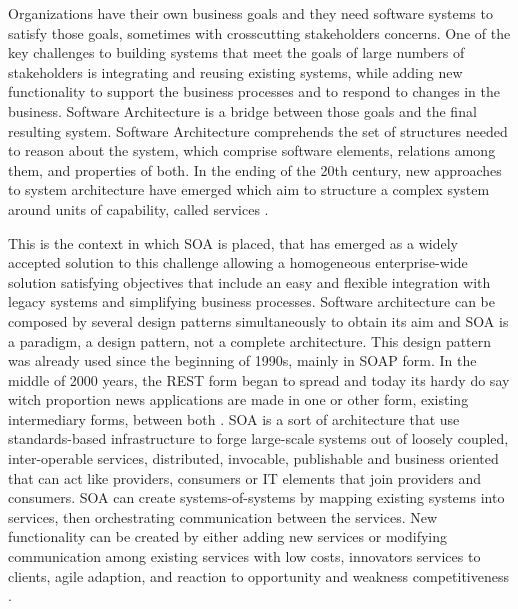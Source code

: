 Organizations have their own business goals and they need software systems to satisfy those goals, sometimes with crosscutting stakeholders concerns. One of the key challenges to building systems that meet the goals of large numbers of stakeholders is integrating and reusing existing systems, while adding new functionality to support the business processes and to respond to changes in the business. Software Architecture is a bridge between those goals and the final resulting system. Software Architecture comprehends the set of structures needed to reason about the system, which comprise software elements, relations among them, and properties of both. In the ending of the 20th century, new approaches to system architecture have emerged which aim to structure a complex system around units of capability, called services \cite{bass2007software,Demchak2007,krogdahl2005service}.

This is the context in which \acrfull{SOA} is placed, that has emerged as a widely accepted solution to this challenge allowing a homogeneous enterprise-wide solution satisfying objectives that include an easy and flexible integration with legacy systems and simplifying business processes. Software architecture can be composed by several design patterns simultaneously to obtain its aim and \acrshort{SOA} is a paradigm, a design pattern, not a complete architecture. This design pattern was already used since the beginning of 1990s, mainly in \acrfull{SOAP} \cite{erl2008soa,ZurMuehlen2005} form. In the middle of 2000 years, the \acrfull{REST} \cite{Severance2015,ZurMuehlen2005} form began to spread and today its hardy do say witch proportion news applications are made in one or other form, existing intermediary forms, between both \cite{ZurMuehlen2005}. \acrshort{SOA} is a sort of architecture that use standards-based infrastructure to forge large-scale systems out of loosely coupled, inter-operable services, distributed, invocable, publishable and business oriented that can act like providers, consumers or \acrfull{IT} elements that join providers and consumers. \acrshort{SOA} can create systems-of-systems by mapping existing systems into services, then orchestrating communication between the services. New functionality can be created by either adding new services or modifying communication among existing services with low costs, innovators services to clients, agile adaption, and reaction to opportunity and weakness competitiveness \cite{bass2007software,Demchak2007,Shi2000,idoughi2010towards,Meijer2011,Chehili2013,Bianco2007,Jamek2015}.

